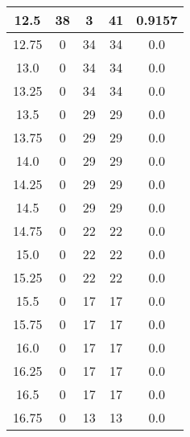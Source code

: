 \documentclass[letterpaper, 12pt]{article}
\begin{document}
\begin{longtable}{|c|c|c|c|c|}
12.5 & 38 & 3 & 41 & 0.9157 \\
\hline
12.75 & 0 & 34 & 34 & 0.0 \\
\hline
13.0 & 0 & 34 & 34 & 0.0 \\
\hline
13.25 & 0 & 34 & 34 & 0.0 \\
\hline
13.5 & 0 & 29 & 29 & 0.0 \\
\hline
13.75 & 0 & 29 & 29 & 0.0 \\
\hline
14.0 & 0 & 29 & 29 & 0.0 \\
\hline
14.25 & 0 & 29 & 29 & 0.0 \\
\hline
14.5 & 0 & 29 & 29 & 0.0 \\
\hline
14.75 & 0 & 22 & 22 & 0.0 \\
\hline
15.0 & 0 & 22 & 22 & 0.0 \\
\hline
15.25 & 0 & 22 & 22 & 0.0 \\
\hline
15.5 & 0 & 17 & 17 & 0.0 \\
\hline
15.75 & 0 & 17 & 17 & 0.0 \\
\hline
16.0 & 0 & 17 & 17 & 0.0 \\
\hline
16.25 & 0 & 17 & 17 & 0.0 \\
\hline
16.5 & 0 & 17 & 17 & 0.0 \\
\hline
16.75 & 0 & 13 & 13 & 0.0 \\
\hline
\end{longtable}
\end{document}
